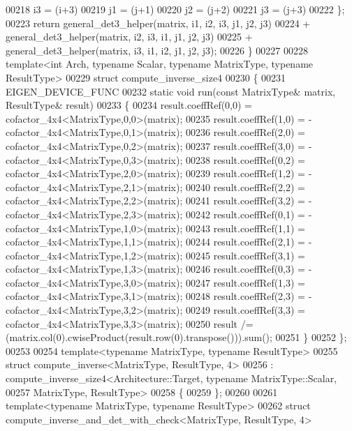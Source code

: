 \begin{DoxyCode}
00218     i3 = (i+3) %
00219     j1 = (j+1) %
00220     j2 = (j+2) %
00221     j3 = (j+3) %
00222   \};
00223   \textcolor{keywordflow}{return} general\_det3\_helper(matrix, i1, i2, i3, j1, j2, j3)
00224        + general\_det3\_helper(matrix, i2, i3, i1, j1, j2, j3)
00225        + general\_det3\_helper(matrix, i3, i1, i2, j1, j2, j3);
00226 \}
00227 
00228 \textcolor{keyword}{template}<\textcolor{keywordtype}{int} Arch, \textcolor{keyword}{typename} Scalar, \textcolor{keyword}{typename} MatrixType, \textcolor{keyword}{typename} ResultType>
00229 \textcolor{keyword}{struct }compute\_inverse\_size4
00230 \{
00231   EIGEN\_DEVICE\_FUNC
00232   \textcolor{keyword}{static} \textcolor{keywordtype}{void} run(\textcolor{keyword}{const} MatrixType& matrix, ResultType& result)
00233   \{
00234     result.coeffRef(0,0) =  cofactor\_4x4<MatrixType,0,0>(matrix);
00235     result.coeffRef(1,0) = -cofactor\_4x4<MatrixType,0,1>(matrix);
00236     result.coeffRef(2,0) =  cofactor\_4x4<MatrixType,0,2>(matrix);
00237     result.coeffRef(3,0) = -cofactor\_4x4<MatrixType,0,3>(matrix);
00238     result.coeffRef(0,2) =  cofactor\_4x4<MatrixType,2,0>(matrix);
00239     result.coeffRef(1,2) = -cofactor\_4x4<MatrixType,2,1>(matrix);
00240     result.coeffRef(2,2) =  cofactor\_4x4<MatrixType,2,2>(matrix);
00241     result.coeffRef(3,2) = -cofactor\_4x4<MatrixType,2,3>(matrix);
00242     result.coeffRef(0,1) = -cofactor\_4x4<MatrixType,1,0>(matrix);
00243     result.coeffRef(1,1) =  cofactor\_4x4<MatrixType,1,1>(matrix);
00244     result.coeffRef(2,1) = -cofactor\_4x4<MatrixType,1,2>(matrix);
00245     result.coeffRef(3,1) =  cofactor\_4x4<MatrixType,1,3>(matrix);
00246     result.coeffRef(0,3) = -cofactor\_4x4<MatrixType,3,0>(matrix);
00247     result.coeffRef(1,3) =  cofactor\_4x4<MatrixType,3,1>(matrix);
00248     result.coeffRef(2,3) = -cofactor\_4x4<MatrixType,3,2>(matrix);
00249     result.coeffRef(3,3) =  cofactor\_4x4<MatrixType,3,3>(matrix);
00250     result /= (matrix.col(0).cwiseProduct(result.row(0).transpose())).sum();
00251   \}
00252 \};
00253 
00254 \textcolor{keyword}{template}<\textcolor{keyword}{typename} MatrixType, \textcolor{keyword}{typename} ResultType>
00255 \textcolor{keyword}{struct }compute\_inverse<MatrixType, ResultType, 4>
00256  : compute\_inverse\_size4<Architecture::Target, typename MatrixType::Scalar,
00257                             MatrixType, ResultType>
00258 \{
00259 \};
00260 
00261 \textcolor{keyword}{template}<\textcolor{keyword}{typename} MatrixType, \textcolor{keyword}{typename} ResultType>
00262 \textcolor{keyword}{struct }compute\_inverse\_and\_det\_with\_check<MatrixType, ResultType, 4>

\end{DoxyCode}
